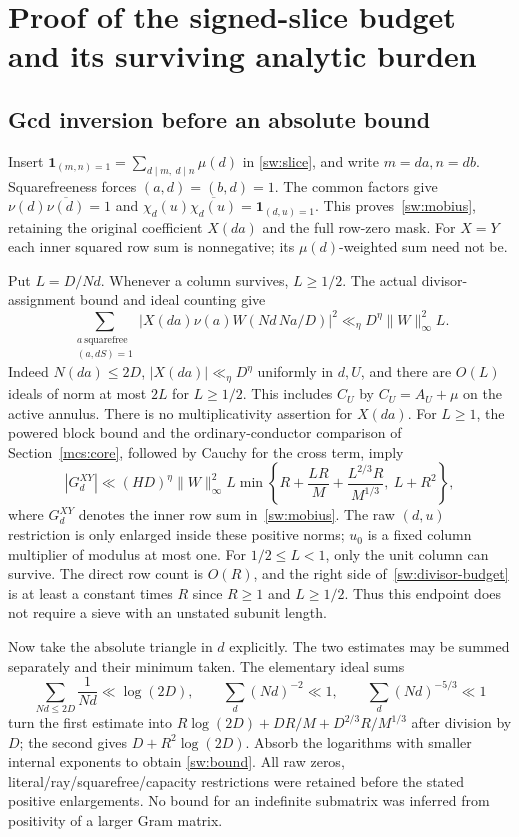 \section{Proof of the signed-slice budget and its surviving analytic burden}\label{sw:details}
\subsection{Gcd inversion before an absolute bound}
Insert $\mathbf1_{(m,n)=1}=\sum_{d\mid m,\ d\mid n}\mu(d)$ in
\eqref{sw:slice}, and write $m=da,n=db$. Squarefreeness forces
$(a,d)=(b,d)=1$. The common factors give
$\nu(d)\overline{\nu(d)}=1$ and
$\chi_d(u)\overline{\chi_d(u)}=\mathbf1_{(d,u)=1}$.
This proves~\eqref{sw:mobius}, retaining the original coefficient
$X(da)$ and the full row-zero mask. For $X=Y$ each inner squared row sum
is nonnegative; its $\mu(d)$-weighted sum need not be.

Put $L=D/Nd$. Whenever a column survives, $L\ge1/2$.
The actual divisor-assignment bound and ideal counting give
\[
 \sum_{\substack{a\ \mathrm{squarefree}\\(a,dS)=1}}
 |X(da)\nu(a)W(Nd\,Na/D)|^2
       \ll_\eta D^\eta\|W\|_\infty^2 L.
\]
Indeed $N(da)\le2D$, $|X(da)|\ll_\eta D^\eta$ uniformly in $d,U$,
and there are $O(L)$ ideals of norm at most $2L$ for $L\ge1/2$.
This includes $C_U$ by $C_U=A_U+\mu$ on the active annulus.
There is no multiplicativity assertion for $X(da)$.
For $L\ge1$, the powered block bound and the ordinary-conductor comparison
of Section~\ref{mcs:core}, followed by Cauchy for the cross term, imply
\begin{equation}\label{sw:divisor-budget}
 |G_d^{XY}|\ll (HD)^\eta\|W\|_\infty^2 L
 \min\left\{R+\frac{LR}{M}+\frac{L^{2/3}R}{M^{1/3}},\ L+R^2\right\},
\end{equation}
where $G_d^{XY}$ denotes the inner row sum in~\eqref{sw:mobius}.
The raw $(d,u)$ restriction is only enlarged inside these positive norms;
$u_0$ is a fixed column multiplier of modulus at most one.
For $1/2\le L<1$, only the unit column can survive. The direct row count
is $O(R)$, and the right side of~\eqref{sw:divisor-budget} is at least a
constant times $R$ since $R\ge1$ and $L\ge1/2$.
Thus this endpoint does not require a sieve with an unstated subunit length.

Now take the absolute triangle in $d$ explicitly. The two estimates may
be summed separately and their minimum taken. The elementary ideal sums
\[
 \sum_{Nd\le2D}\frac1{Nd}\ll\log(2D),\qquad
 \sum_d(Nd)^{-2}\ll1,\qquad \sum_d(Nd)^{-5/3}\ll1
\]
turn the first estimate into
$R\log(2D)+DR/M+D^{2/3}R/M^{1/3}$ after division by $D$;
the second gives $D+R^2\log(2D)$.
Absorb the logarithms with smaller internal exponents to obtain
\eqref{sw:bound}. All raw zeros, literal/ray/squarefree/capacity restrictions
were retained before the stated positive enlargements. No bound for an
indefinite submatrix was inferred from positivity of a larger Gram matrix.

